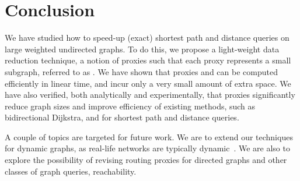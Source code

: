 \section{Conclusion}
\label{sec-con}

We have studied how to speed-up (exact)  shortest path and distance queries on large weighted undirected graphs.
To do this, we  propose  a light-weight data reduction technique, a notion of proxies such that each proxy represents a small subgraph, referred to as \dras. We have shown that
proxies and \dras can be computed efficiently in linear time, and incur only a very small amount of extra space.  We have also verified,
both analytically and experimentally, that proxies significantly reduce graph sizes and improve efficiency of existing methods, such as bidirectional Dijkstra, \arcflag and  \tnr for shortest path and distance queries.

A couple of topics are targeted for future work.
%
We are to extend our techniques for dynamic graphs, as real-life networks are typically dynamic~\cite{fcs-biggraph}.
%
We are also to explore the possibility of revising routing proxies for directed graphs and other classes of graph queries, \eg reachability.
